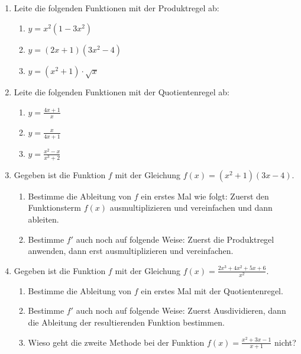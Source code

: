 \begin{ueb}
	{}{}
	\begin{enumerate}
		\item Leite die folgenden Funktionen mit der Produktregel ab:
		      \begin{enumerate}
			      \item $y= x^2(1-3x^2)$
			      \item $y= (2x+1)(3x^2-4)$
			      \item $y= (x^2+1) \cdot \sqrt{x}$
		      \end{enumerate}



		\item Leite die folgenden Funktionen mit der Quotientenregel ab:
		      \begin{enumerate}
			      \item $y= \frac{4x+1}{x}$
			      \item $y= \frac{x}{4x+1}$
			      \item $y= \frac{x^2-x}{x^3+2}$
		      \end{enumerate}

		\item Gegeben ist die Funktion \( f \) mit der Gleichung \( f(x) = (x^2 + 1)(3x - 4) \).
		      \begin{enumerate}
			      \item Bestimme die Ableitung von \( f \) ein erstes Mal wie folgt: Zuerst den Funktionsterm \( f(x) \) ausmultiplizieren und vereinfachen und dann ableiten.
			      \item Bestimme \( f' \) auch noch auf folgende Weise: Zuerst die Produktregel anwenden, dann erst ausmultiplizieren und vereinfachen.
		      \end{enumerate}

		\item Gegeben ist die Funktion \( f \) mit der Gleichung \( f(x) = \frac{2x^3+4x^2+5x+6}{x^2} \).
		      \begin{enumerate}
			      \item Bestimme die Ableitung von \( f \) ein erstes Mal mit der Quotientenregel.
			      \item Bestimme \( f' \) auch noch auf folgende Weise: Zuerst Ausdividieren, dann die Ableitung der resultierenden Funktion bestimmen.
			      \item Wieso geht die zweite Methode bei der Funktion $f(x) = \frac{x^2+3x-1}{x+1}$ nicht?
		      \end{enumerate}



\end{enumerate}
\end{ueb}
